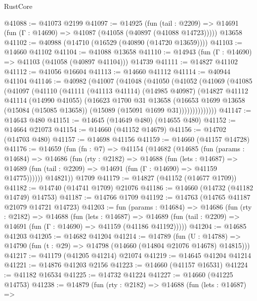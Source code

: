 \begin{lexlean}{RustCore}
\begin{coremodule}
@41088 := @41073 @2199
@41097 := @14925
    (fun (tail : @2209) => @14691 (fun (Γ : @14690) => @41087 (@41058 (@40897 (@41088 @14723)))))
    @13658
@41102 := @40988 (@14710 (@16529 (@40890 (@14720 @13659))))
@41103 := @14660 @41102
@41104 := @41088 @13658
@41110 := @14943 (fun (Γ : @14690) => @41103 (@41058 (@40897 @41104))) @14739
@41111 := @14827 @41102
@41112 := @41056 @16604
@41113 := @14660 @41112
@41114 := @40944 @41104
@41146 := @40982
    (@41007
      (@41048
        (@41050
          (@41052
            (@41069
              (@41085
                (@41097
                  (@41110
                    (@41111
                      (@41113 @41114)
                      (@14985 @40987)
                      (@14827
                        @41112
                        @41114
                        (@14990 @41055)
                        (@16623
                          @1700
                          @31
                          @13658
                          (@16653
                            @1699
                            @13658
                            (@15084 (@15085 @13658))
                            (@15089 (@15091 @1699 @31))))))))))))))
@41147 := @14643 @480
@41151 := @14645 (@14649 @480) (@14655 @480)
@41152 := @14664 @21073
@41154 := @14660 (@41152 @14679)
@41156 := @14702 (@14703 @480)
@41157 := @14698 @41156
@41159 := @14660 (@41157 @14728)
@41176 := @14659
    (fun (fn : @7) =>
    @41154
      (@14682
        (@14685
          (fun (params : @14684) =>
          @14686
            (fun (rty : @2182) =>
            @14688
              (fun (lets : @14687) =>
              @14689 (fun (tail : @2209) => @14691 (fun (Γ : @14690) => @41159 @14775))))))
        @14821))
    @1709
@41179 := @14827 (@41152 (@14677 @1709))
@41182 := @14740 (@14741 @1709) @21076
@41186 := @14660 (@14732 (@41182 @14749) @14753)
@41187 := @14766 @1709
@41192 := @14763 (@14765 @41187 @21079 @14721 @14723)
@41203 := fun (params : @14684) =>
  @14686
    (fun (rty : @2182) =>
    @14688
      (fun (lets : @14687) =>
      @14689 (fun (tail : @2209) => @14691 (fun (Γ : @14690) => @41159 (@41186 @41192)))))
@41204 := @14685 @41203
@41205 := @14682 @41204
@41214 := @14789
    (fun (U : @14788) => @14790 (fun (t : @29) => @14798 (@14660 (@14804 @21076 @14678) @14815)))
@41217 := @41179 (@41205 @41214) @21074
@41219 := @14645 @41204 @41214
@41221 := @14876 @41203 @2156
@41223 := @14660 (@41157 @16531)
@41224 := @41182 @16534
@41225 := @14732 @41224
@41227 := @14660 (@41225 @14753)
@41238 := @14879
    (fun (rty : @2182) =>
    @14688
      (fun (lets : @14687) =>

\end{coremodule}
\end{lexlean}
